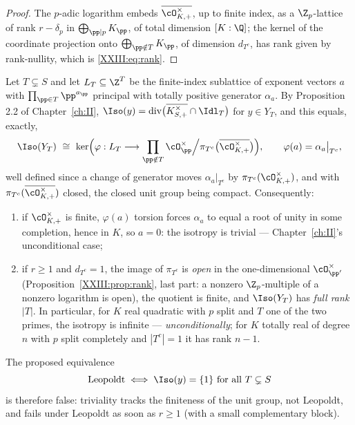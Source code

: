 \begin{proof}
The $p$-adic logarithm embeds $\overline{\cO^\times_{K,+}}$, up to finite index, as a
$\Z_p$-lattice of rank $r-\delta_p$ in $\bigoplus_{\pp\mid p}K_\pp$, of total dimension
$[K:\Q]$; the kernel of the coordinate projection onto
$\bigoplus_{\pp\notin T}K_\pp$, of dimension $d_{T^c}$, has rank given by rank-nullity,
which is \eqref{XXIII:eq:rank}.
\end{proof}

\begin{theorem}\label{XXIII:thm:nottrivial}
Let $T\subsetneq S$ and let $L_T\subseteq\Z^T$ be the finite-index sublattice of exponent
vectors $a$ with $\prod_{\pp\in T}\pp^{a_\pp}$ principal with totally positive generator
$\alpha_a$. By Proposition 2.2 of Chapter~\ref{ch:II},
$\Iso(y)=\mathrm{div}\bigl(\overline{K^\times_{S,+}}\cap\Idl_T\bigr)$ for $y\in Y_T$, and
this equals, exactly,
\[
\Iso(Y_T)\ \cong\ \ker\Bigl(\varphi:L_T\longrightarrow
\prod_{\pp\notin T}\cO_\pp^\times\Big/\pi_{T^c}\bigl(\overline{\cO^\times_{K,+}}\bigr)\Bigr),
\qquad \varphi(a)=\alpha_a\big|_{T^c},
\]
well defined since a change of generator moves $\alpha_a|_{T^c}$ by
$\pi_{T^c}(\cO^\times_{K,+})$, and with $\pi_{T^c}(\overline{\cO^\times_{K,+}})$ closed, the
closed unit group being compact. Consequently:
\begin{enumerate}
\item if $\cO^\times_{K,+}$ is finite, $\varphi(a)$ torsion forces $\alpha_a$ to equal a
root of unity in some completion, hence in $K$, so $a=0$: the isotropy is trivial ---
Chapter~\ref{ch:II}'s unconditional case;
\item if $r\ge1$ and $d_{T^c}=1$, the image of $\pi_{T^c}$ is \emph{open} in the
one-dimensional $\cO_{\pp'}^\times$ (Proposition~\ref{XXIII:prop:rank}, last part: a nonzero
$\Z_p$-multiple of a nonzero logarithm is open), the quotient is finite, and
$\Iso(Y_T)$ has \emph{full rank} $|T|$. In particular, for $K$ real quadratic with $p$
split and $T$ one of the two primes, the isotropy is infinite --- \emph{unconditionally};
for $K$ totally real of degree $n$ with $p$ split completely and $|T^c|=1$ it has rank
$n-1$.
\end{enumerate}
The proposed equivalence
\[
\text{Leopoldt}\iff\Iso(y)=\{1\}\ \text{for all}\ T\subsetneq S
\]
is therefore false: triviality tracks the finiteness of the unit group, not Leopoldt, and
fails under Leopoldt as soon as $r\ge1$ (with a small complementary block).
\end{theorem}

